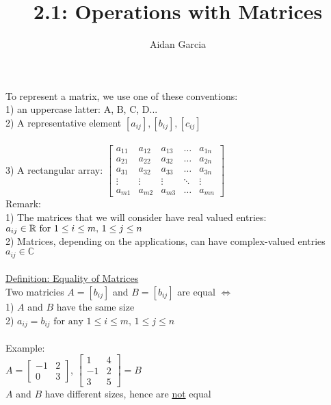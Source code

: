 \documentclass{jhwhw}
\author{Aidan Garcia}
\title{2.1: Operations with Matrices}
\begin{document}
To represent a matrix, we use one of these conventions:\\
1) an uppercase latter: A, B, C, D...\\
2) A representative element \([a_{ij}], [b_{ij}], [c_{ij}]\)\\ \\
3) A rectangular array: \(\begin{bmatrix} a_{11} & a_{12} & a_{13} & \ldots & a_{1n} \\ a_{21} & a_{22} & a_{32} & \ldots & a_{2n} \\ a_{31} & a_{32} & a_{33} & \ldots & a_{3n} \\ \vdots & \vdots & \vdots & \ddots & \vdots \\ a_{m1} & a_{m2} & a_{m3} & \ldots & a_{mn} \end{bmatrix}\)\\

Remark:\\
1) The matrices that we will consider have real valued entries: \(a_{ij} \in \mathbb{R} \\ \text{ for } 1 \leq i \leq m, \, 1 \leq j \leq n\)\\
2) Matrices, depending on the applications, can have complex-valued entries \(a_{ij} \in \mathbb{C}\)
\\ \\

\underline{Definition: Equality of Matrices}\\
Two matricies \(A = [b_{ij}]\) and \(B = [b_{ij}]\) are equal \(\iff\)\\
1) \(A\) and \(B\) have the same size\\
2) \(a_{ij} = b_{ij} \text{ for any } 1 \leq i \leq m, \, 1 \leq j \leq n\)
\\ \\

Example:
\\

\(A = \begin{bmatrix} -1 & 2 \\ 0 & 3 \end{bmatrix}\), \(\begin{bmatrix} 1 & 4 \\ -1 & 2 \\ 3 & 5 \end{bmatrix} = B\)\\

\(A\) and \(B\) have different sizes, hence are \underline{not} equal\\
\end{document}
